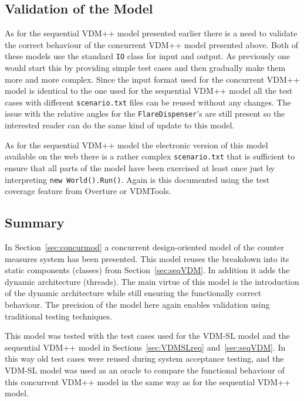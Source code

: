 \documentclass{overturerepchap}
\newcommand{\VDMTools}{VDMTools}
\begin{document}
\subsection{Validation of the Model}

As for the sequential VDM++ model presented earlier there is a need to
validate the correct behaviour of the concurrent VDM++ model presented
above. Both of these models use the standard
\texttt{IO} class for input and output. As previously one would start 
this by providing simple test cases and
then gradually make them more and more complex. Since the input format
used for the concurrent VDM++ model is identical to the one used for the
sequential VDM++ model all the test cases with different 
\texttt{scenario.txt} files can be reused without any changes. 
The issue with the 
relative angles for the \texttt{FlareDispenser}'s are still present
so the interested reader can do the same kind of update to this model.

As for the sequential VDM++ model the electronic
version of this model available on the web there is a rather complex 
\texttt{scenario.txt} that is sufficient to ensure that all parts of the
model have been exercised at least once just by interpreting
\texttt{new World().Run()}. Again is this documented using the
test coverage feature from Overture or \VDMTools. 

\subsection{Summary}

In Section~\ref{sec:concurmod} a concurrent design-oriented model of
the counter measures system has been presented. This model reuses the
breakdown into its static components (classes) from
Section~\ref{sec:seqVDM}. In addition it adds the dynamic architecture
(threads). The main virtue of this model is the introduction of the
dynamic architecture while still ensuring the functionally correct
behaviour. The precision of the model here again enables validation
using traditional testing techniques.

This model was tested with the test cases used for the VDM-SL model
and the sequential VDM++ model in Sections~\ref{sec:VDMSLreq}
and~\ref{sec:seqVDM}. In this way old test cases were reused during
system acceptance testing, and the VDM-SL model was used as an oracle
to compare the functional behaviour of this concurrent VDM++ model in
the same way as for the sequential VDM++ model.
\end{document}
